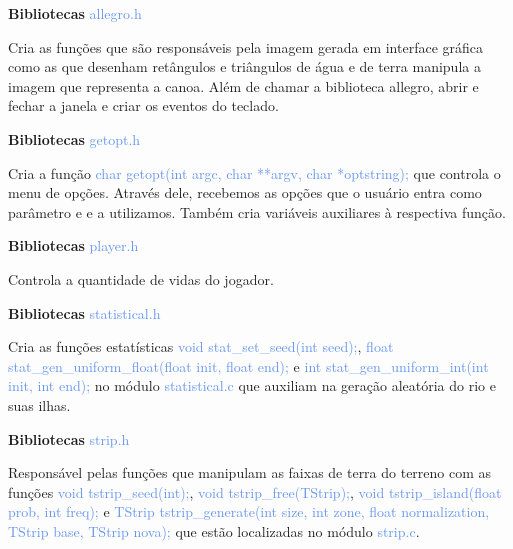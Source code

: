 \documentclass[a4paper,12pt]{article}
\begin{document}
\newpage %

{\Large \textcolor{NavyBlue}{ \textbf{Bibliotecas  }}}{\large \textcolor{CornflowerBlue}{  allegro.h}}
\bigskip

Cria as funções que são responsáveis pela imagem gerada em interface gráfica como as que
desenham retângulos e triângulos de água e de terra manipula a imagem que representa a canoa. Além de chamar a
biblioteca allegro, abrir e fechar a janela e criar os eventos do teclado. 
\bigskip
\bigskip
\bigskip

{\Large \textcolor{NavyBlue}{ \textbf{Bibliotecas  }}}{\large \textcolor{CornflowerBlue}{  getopt.h}}
\bigskip

Cria a função {\textcolor{CornflowerBlue}{char getopt(int argc, char **argv, char *optstring);}}
que controla o menu de opções. Através dele, recebemos as opções que o usuário entra como parâmetro e 
e a utilizamos. Também cria variáveis auxiliares à respectiva função.
\bigskip
\bigskip
\bigskip

{\Large \textcolor{NavyBlue}{ \textbf{Bibliotecas  }}}{\large \textcolor{CornflowerBlue}{  player.h}}
\bigskip

Controla a quantidade de vidas do jogador.
\bigskip
\bigskip
\bigskip

{\Large \textcolor{NavyBlue}{ \textbf{Bibliotecas  }}}{\large \textcolor{CornflowerBlue}{  statistical.h}}
\bigskip

Cria as funções estatísticas
{\textcolor{CornflowerBlue}{void  stat\_set\_seed(int seed);}},  
{\textcolor{CornflowerBlue}{float stat\_gen\_uniform\_float(float init, float end);}} e 
{\textcolor{CornflowerBlue}{int stat\_gen\_uniform\_int(int init, int end);}} no módulo 
{\textcolor{CornflowerBlue}{statistical.c}} que auxiliam na geração aleatória do rio e suas ilhas.
\bigskip
\bigskip
\bigskip

{\Large \textcolor{NavyBlue}{ \textbf{Bibliotecas  }}}{\large \textcolor{CornflowerBlue}{  strip.h}}
\bigskip

Responsável pelas funções que manipulam as faixas de terra do terreno com as funções
{\textcolor{CornflowerBlue}{void   tstrip\_seed(int);}}, 
{\textcolor{CornflowerBlue}{void   tstrip\_free(TStrip);}},  
{\textcolor{CornflowerBlue}{void   tstrip\_island(float prob, int freq);}} e 
{\textcolor{CornflowerBlue}{TStrip tstrip\_generate(int size, int zone, float normalization, TStrip base, TStrip nova);}} que estão localizadas no módulo 
{\textcolor{CornflowerBlue}{strip.c}}.
\bigskip
\bigskip
\bigskip
\end{document}
